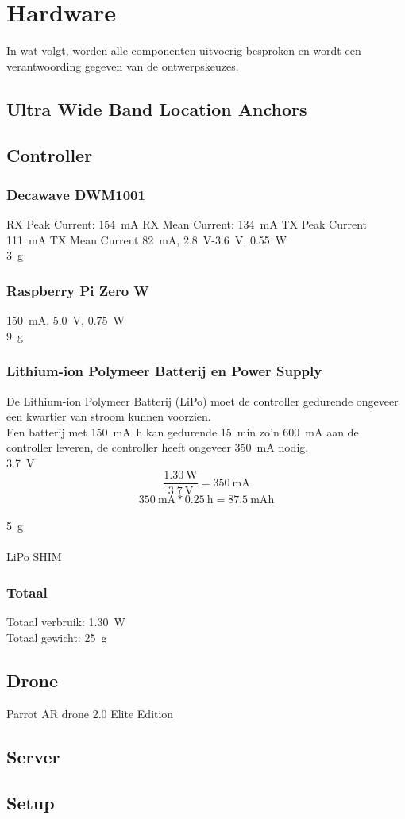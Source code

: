 \chapter{Hardware}
In wat volgt, worden alle componenten uitvoerig besproken en wordt een verantwoording gegeven van de ontwerpskeuzes.

\section{Ultra Wide Band Location Anchors}  \label{sec:uwb_location_anchors}


\section{Controller} \label{sec:controller}
\subsection{Decawave DWM1001}  \label{sec:decawave}
RX Peak Current: \SI{154}{\mA} RX Mean Current: \SI{134}{\mA} TX Peak Current \SI{111}{\mA} TX Mean Current \SI{82}{mA}, \SI{2.8}{\V}-\SI{3.6}{\V}, \SI{0.55}{\W}\\
\SI{3}{\g}

\subsection{Raspberry Pi Zero W} \label{sec:raspberry_pi}
\SI{150}{\mA}, \SI{5.0}{\V}, \SI{0.75}{\W}\\
\SI{9}{\g}

\subsection{Lithium-ion Polymeer Batterij en Power Supply} \label{sec:lipo}
De Lithium-ion Polymeer Batterij (LiPo) moet de controller gedurende ongeveer een kwartier van stroom kunnen voorzien.\\
Een batterij met \SI{150}{\mA\hour} kan gedurende \SI{15}{\minute} zo'n \SI{600}{\mA} aan de controller leveren, de controller heeft ongeveer \SI{350}{\mA} nodig.\\
\SI{3.7}{\V}
\[\frac{\SI{1.30}{\W}}{\SI{3.7}{\V}}=\SI{350}{\mA}\]
\[\SI{350}{\mA}*\SI{0.25}{\hour}=\SI{87.5}{\mA\hour}\]\\
\SI{5}{\g}\\
\\
LiPo SHIM

\subsection{Totaal} \label{sec:totaal}
Totaal verbruik: \SI{1.30}{\W}\\
Totaal gewicht: \SI{25}{\g}

\section{Drone} \label{sec:drone}
Parrot AR drone 2.0 Elite Edition

\section{Server} \label{sec:server}


\section{Setup} \label{sec:setup}
